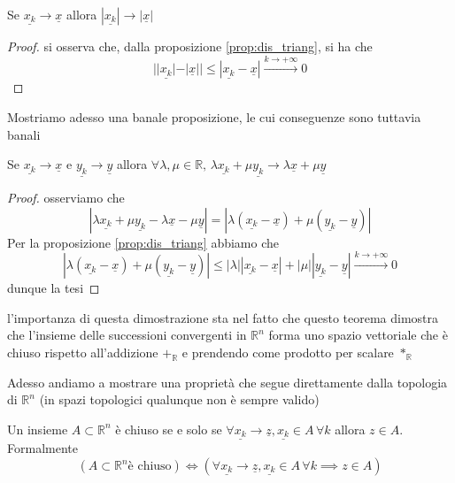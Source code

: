\documentclass[openany]{book}
\begin{document}
\begin{prop}
Se $\underline{x_k} \to \underline{x}$ allora $|\underline{x_k}| \to |\underline{x}|$
\end{prop}
\begin{proof}
si osserva che, dalla proposizione \ref{prop:dis_triang}, si ha che
$$
||\underline{x_k}| - |\underline{x}|| \leq |\underline{x_k} - \underline{x}| \stackrel{k \to +\infty}{\to} 0
$$
\end{proof}
Mostriamo adesso una banale proposizione, le cui conseguenze sono tuttavia banali
\begin{prop}
Se $\underline{x_k} \to \underline{x}$ e $\underline{y_k} \to \underline{y}$ allora $\forall \lambda, \mu \in \mathbb{R}, \, \lambda \underline{x_k} + \mu \underline{y_k} \to \lambda \underline{x} + \mu \underline{y}$ 
\end{prop}
\begin{proof}
osserviamo che
$$
|\lambda \underline{x_k} + \mu \underline{y_k} - \lambda \underline{x} - \mu \underline{y}| = |\lambda (\underline{x_k} - \underline{x}) + \mu (\underline{y_k} - \underline{y})|
$$
Per la proposizione \ref{prop:dis_triang} abbiamo che
$$
|\lambda (\underline{x_k} - \underline{x}) + \mu (\underline{y_k} - \underline{y})| \leq |\lambda| |\underline{x_k} - \underline{x}| + |\mu| |\underline{y_k} - \underline{y}| \stackrel{k \to +\infty}{\to} 0
$$
dunque la tesi
\end{proof}
\begin{remark}
l'importanza di questa dimostrazione sta nel fatto che questo teorema dimostra che l'insieme delle successioni convergenti in $\mathbb{R}^n$ forma uno spazio vettoriale che è chiuso rispetto all'addizione $+_{\mathbb{R}}$ e prendendo come prodotto per scalare $*_\mathbb{R}$
\end{remark}
\noindent Adesso andiamo a mostrare una proprietà che segue direttamente dalla topologia di $\mathbb{R}^n$ (in spazi topologici qualunque non è sempre valido)
\begin{prop}
	Un insieme $A \subset \mathbb{R}^n$ è chiuso se e solo se $\forall \underline{x_k} \to \underline{z}, \underline{x_k} \in A \, \forall k$ allora $z \in A$. Formalmente
	$$
	(A \subset \mathbb{R}^n \text{è chiuso}) \iff (\forall \underline{x_k} \to \underline{z}, \underline{x_k} \in A \, \forall k \implies z \in A) 
	$$
\end{prop}
\end{document}
